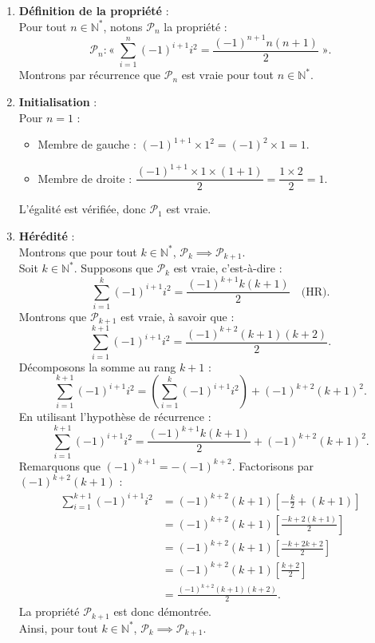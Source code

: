 \documentclass[11pt,a4paper]{article}
\newcommand{\N}{\mathbb{N}}
\begin{document}
\begin{correctionbox}
\begin{enumerate}[label=\textbf{\arabic*.}]
    \item \textbf{Définition de la propriété} :\\
    Pour tout $n \in \N^*$, notons $\mathcal{P}_n$ la propriété :
    \[
    \mathcal{P}_n : « \; \sum_{i=1}^n (-1)^{i+1} i^2 = \frac{(-1)^{n+1} n(n+1)}{2} \; ».
    \]
    Montrons par récurrence que $\mathcal{P}_n$ est vraie pour tout $n \in \N^*$.

    \item \textbf{Initialisation} :\\
    Pour $n = 1$ :
    \begin{itemize}
        \item Membre de gauche : $(-1)^{1+1} \times 1^2 = (-1)^2 \times 1 = 1$.
        \item Membre de droite : $\dfrac{(-1)^{1+1} \times 1 \times (1+1)}{2} = \dfrac{1 \times 2}{2} = 1$.
    \end{itemize}
    L'égalité est vérifiée, donc $\mathcal{P}_1$ est vraie.

    \item \textbf{Hérédité} :\\
    Montrons que pour tout $k \in \N^*$, $\mathcal{P}_k \implies \mathcal{P}_{k+1}$.\\
    Soit $k \in \N^*$. Supposons que $\mathcal{P}_k$ est vraie, c'est-à-dire :
    \[
    \sum_{i=1}^k (-1)^{i+1} i^2 = \frac{(-1)^{k+1} k(k+1)}{2} \quad \text{(HR)}.
    \]
    Montrons que $\mathcal{P}_{k+1}$ est vraie, à savoir que :
    \[
    \sum_{i=1}^{k+1} (-1)^{i+1} i^2 = \frac{(-1)^{k+2} (k+1)(k+2)}{2}.
    \]
    Décomposons la somme au rang $k+1$ :
    \[
    \sum_{i=1}^{k+1} (-1)^{i+1} i^2 = \left(\sum_{i=1}^k (-1)^{i+1} i^2\right) + (-1)^{k+2} (k+1)^2.
    \]
    En utilisant l'hypothèse de récurrence :
    \[
    \sum_{i=1}^{k+1} (-1)^{i+1} i^2 = \frac{(-1)^{k+1} k(k+1)}{2} + (-1)^{k+2} (k+1)^2.
    \]
    Remarquons que $(-1)^{k+1} = - (-1)^{k+2}$. Factorisons par $(-1)^{k+2}(k+1)$ :
    \begin{align*}
    \sum_{i=1}^{k+1} (-1)^{i+1} i^2 &= (-1)^{k+2}(k+1) \left[ -\frac{k}{2} + (k+1) \right] \\
                                   &= (-1)^{k+2}(k+1) \left[ \frac{-k + 2(k+1)}{2} \right] \\
                                   &= (-1)^{k+2}(k+1) \left[ \frac{-k + 2k + 2}{2} \right] \\
                                   &= (-1)^{k+2}(k+1) \left[ \frac{k+2}{2} \right] \\
                                   &= \frac{(-1)^{k+2} (k+1)(k+2)}{2}.
    \end{align*}
    La propriété $\mathcal{P}_{k+1}$ est donc démontrée.\\
    Ainsi, pour tout $k \in \N^*$, $\mathcal{P}_k \implies \mathcal{P}_{k+1}$.


\end{enumerate}
\end{correctionbox}
\end{document}
